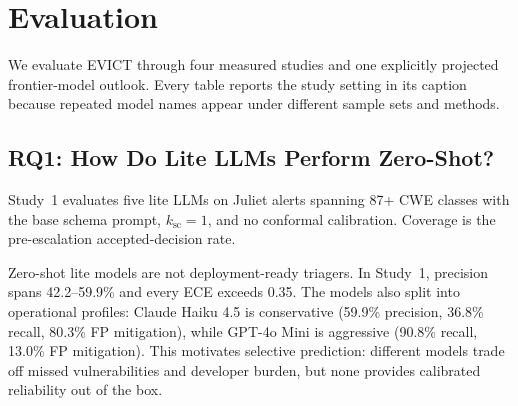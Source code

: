 \section{Evaluation}
\label{sec:evaluation}

We evaluate EVICT through four measured studies and one explicitly projected frontier-model outlook. Every table reports the study setting in its caption because repeated model names appear under different sample sets and methods.

\subsection{RQ1: How Do Lite LLMs Perform Zero-Shot?}

Study~1 evaluates five lite LLMs on Juliet alerts spanning 87+ CWE classes with the base schema prompt, $k_{\mathrm{sc}}=1$, and no conformal calibration. Coverage is the pre-escalation accepted-decision rate.

\begin{table}[t]
\centering
\caption{Study~1 zero-shot baseline on Juliet (87+ CWE classes, $k_{\mathrm{sc}}=1$, no conformal calibration). All metrics are pre-escalation.}
\label{tab:multimodel}
\small
\setlength{\tabcolsep}{4pt}
\end{table}

Zero-shot lite models are not deployment-ready triagers. In Study~1, precision spans 42.2--59.9\% and every ECE exceeds 0.35. The models also split into operational profiles: Claude Haiku 4.5 is conservative (59.9\% precision, 36.8\% recall, 80.3\% FP mitigation), while GPT-4o Mini is aggressive (90.8\% recall, 13.0\% FP mitigation). This motivates selective prediction: different models trade off missed vulnerabilities and developer burden, but none provides calibrated reliability out of the box.

